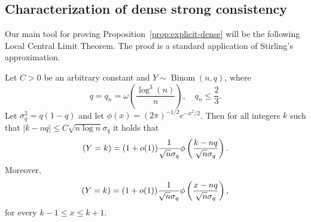 \documentclass[EJP]{ejpecp}
\newcommand{\1}[1]{\mathbbm{1}_{\{#1\}}}
\let\Pr\relax
\DeclareMathOperator{\Pr}{Pr}
\DeclareMathOperator{\Binom}{Binom}
\begin{document}
\subsection{Characterization of dense strong consistency}
Our main tool for proving Proposition~\ref{prop:explicit-dense}
will be the following Local Central Limit Theorem. The proof is a standard
application of Stirling's approximation.
\begin{lemma}\label{lem:lclt}
Let $C > 0$ be an arbitrary constant and $Y \sim \Binom(n,q)$, where
\[
q = q_n = \omega\left(\frac{\log^3(n)}{n}\right), \quad q_n \leq \frac 23.
\]
Let $\sigma_q^2 = q(1-q)$ and let $\phi(x) = (2\pi)^{-1/2} e^{-x^2/2}$.
 Then for all integers $k$ such that $|k-nq| \leq C \sqrt{n \log n} \sigma_q$ it holds that
\[
\Pr(Y = k) = (1+o(1)) \frac{1}{\sqrt n \sigma_q}
\phi \left( \frac{k-nq}{\sqrt{n} \sigma_q} \right).
\]
Moreover,
\[
\Pr(Y = k) = (1+o(1)) \frac{1}{\sqrt n \sigma_q}
\phi \left( \frac{x-nq}{\sqrt{n} \sigma_q} \right),
\]
for every $k-1 \leq x \leq k+1$.
\end{lemma}
\end{document}

